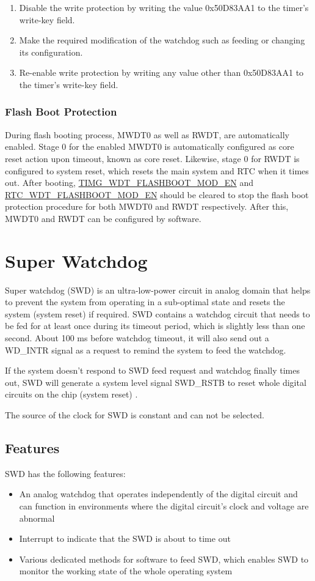 \documentclass[main\_\_EN.tex]{subfiles}
\begin{document}
\begin{enumerate}
\item Disable the write protection by writing the value 0x50D83AA1 to the timer’s write-key field.
\item Make the required modification of the watchdog such as feeding or changing its configuration.
\item Re-enable write protection by writing any value other than 0x50D83AA1 to the timer’s write-key field.
\end{enumerate}

\subsubsection{Flash Boot Protection}
During flash booting process, MWDT0 as well as RWDT, are automatically enabled. Stage 0 for the enabled MWDT0 is automatically configured as core reset action upon timeout, known as core reset. Likewise, stage 0 for RWDT is configured to system reset, which resets the main system and RTC when it times out. After booting, \hyperref[fielddesc:TIMGWDTFLASHBOOTMODEN]{TIMG\_WDT\_FLASHBOOT\_MOD\_EN} and \hyperref[fielddesc:RTCWDTFLASHBOOTMODEN]{RTC\_WDT\_FLASHBOOT\_MOD\_EN}  should be cleared to stop the flash boot protection procedure for both MWDT0 and RWDT respectively. After this, MWDT0 and RWDT can be configured by software.


\section{Super Watchdog}\label{sec:wdt-swdt}
Super watchdog (SWD) is an ultra-low-power circuit in analog domain that helps to prevent the system from operating in a sub-optimal state and resets the system (system reset) if required. SWD contains a watchdog circuit that needs to be fed for at least once during its timeout period, which is slightly less than one second. About 100 ms before watchdog timeout, it will also send out a WD\_INTR signal as a request to remind the system to feed the watchdog.

If the system doesn’t respond to SWD feed request and watchdog finally times out, SWD will generate a system level signal SWD\_RSTB to reset whole digital circuits on the chip (system reset) .

The source of the clock for SWD is constant and can not be selected.


\subsection{Features}
SWD has the following features:
\begin{itemize}
    \item An analog watchdog that operates independently of the digital circuit and can function in environments where the digital circuit's clock and voltage are abnormal
    \item Interrupt to indicate that the SWD is about to time out
    \item Various dedicated methods for software to feed SWD, which enables SWD to monitor the working state of the whole operating system
\end{itemize}
\end{document}
